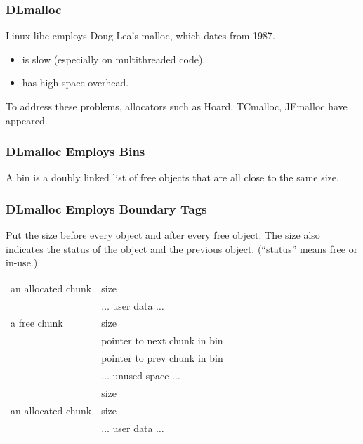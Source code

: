 \documentclass[xcolor=dvipsnames,14pt]{beamer}
\begin{document}
\begin{frame}
\frametitle{DLmalloc}

Linux libc employs Doug Lea's malloc, which dates from 1987.

\begin{itemize}
\item is slow (especially on multithreaded code).
\item has high space overhead.
\end{itemize}

To address these problems, allocators such as Hoard, TCmalloc, JEmalloc have appeared.

\end{frame}

\begin{frame}
\frametitle{DLmalloc Employs Bins}
A bin is a doubly linked list of free objects that are all close to the same size.

\end{frame}

\begin{frame}
\frametitle{DLmalloc Employs Boundary Tags}

Put the size before every object and after every free object.  The
size also indicates the status of the object and the previous
object. (``status'' means free or in-use.)

\begin{center}
\begin{tabular}{l|l|}
                                                    \hline
an allocated chunk & size                         \\ \cline{2-2}
                   & $\ldots$ user data $\ldots$ \\ \hline
a free chunk       & size                         \\ \cline{2-2}
                   & pointer to next chunk in bin \\ \cline{2-2}
                   & pointer to prev chunk in bin \\ \cline{2-2}
                   & $\ldots$ unused space $\ldots$ \\ \cline{2-2}
                   & size                        \\ \hline
an allocated chunk & size                        \\ \cline{2-2}
                   & $\ldots$ user data $\ldots$ \\ \hline
\end{tabular}
\end{center}
\end{frame}
\end{document}
